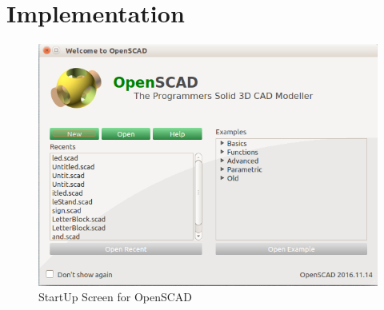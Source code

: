 \section{Implementation}
\begin{figure}
    \centering \includegraphics[width=0.7\linewidth]{images/output/1.png}
    \caption{StartUp Screen for OpenSCAD}
    \label{fig:1}
\end{figure}
